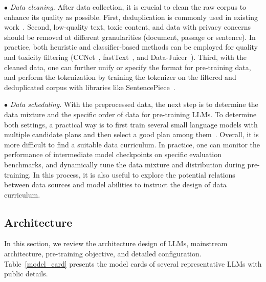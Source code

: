 {{
$\bullet$ \emph{Data cleaning.} After data collection, it is crucial to clean the raw corpus to enhance its quality as possible. First, deduplication is commonly  used in existing work~\cite{Touvron-2023-llama2-arxiv,Tirumala-2023-arXiv-D4,Penedo-2023-arxiv-Refinedweb}.
Second,  low-quality text, toxic content, and data with privacy concerns should be removed at different granularities (\eg document, passage or sentence). In practice,  both heuristic and classifier-based methods can be employed for quality and toxicity filtering (\eg CCNet~\cite{Wenzek-2020-LREC-CCNet}, fastText~\cite{Joulin-2017-EACL-fasttext}, and Data-Juicer~\cite{chen-2023-arXiv-DataJuicer}). Third,  with the cleaned data, one can further unify or specify the  format for pre-training data, and perform the tokenization by training the tokenizer on the filtered and deduplicated corpus with libraries like SentencePiece~\cite{Kudo-EMNLP-2018-SentencePiece}. 
}

{
$\bullet$ \emph{Data scheduling.} %
With the preprocessed data, the next step is to determine the data mixture and the specific order of data for pre-training LLMs.  
To determine both settings, a practical way is to first train several small  language models with multiple candidate plans and then select a good plan among them~\cite{Xie-arxiv-2023-doremi}.
Overall, it is more difficult to find a  suitable data curriculum. 
In practice, one can monitor the performance of intermediate model checkpoints on specific evaluation benchmarks, and dynamically tune the data mixture and distribution during  pre-training. In this process, it is also useful to explore the potential relations between data sources and model abilities to instruct the design of data curriculum. 
}












\subsection{Architecture}
\label{sec:architecture}
 In this section, we review the architecture design  of LLMs, \ie mainstream architecture, pre-training objective, and detailed configuration. Table~\ref{model_card}  presents the model cards of several representative LLMs with public details.  


}
